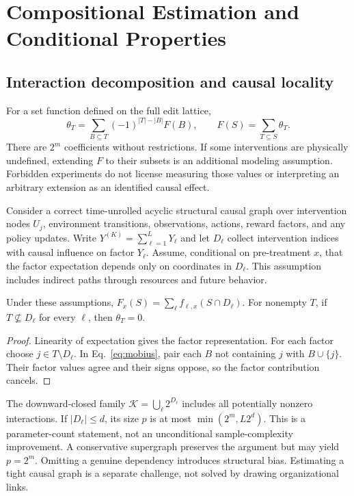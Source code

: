 \documentclass[runningheads]{llncs}
\newcommand{\family}{\mathcal K}
\begin{document}
\section{Compositional Estimation and Conditional Properties}\label{sec:theory}
\subsection{Interaction decomposition and causal locality}
For a set function defined on the full edit lattice,
\begin{equation}\label{eq:mobius}
    \theta_T=\sum_{B\subseteq T}(-1)^{|T|-|B|}F(B),\qquad
    F(S)=\sum_{T\subseteq S}\theta_T.
\end{equation}
There are $2^m$ coefficients without restrictions. If some interventions are physically undefined, extending $F$ to their subsets is an additional modeling assumption. Forbidden experiments do not license measuring those values or interpreting an arbitrary extension as an identified causal effect.

Consider a correct time-unrolled acyclic structural causal graph over intervention nodes $U_j$, environment transitions, observations, actions, reward factors, and any policy updates. Write $Y^{(K)}=\sum_{\ell=1}^L Y_\ell$ and let $D_\ell$ collect intervention indices with causal influence on factor $Y_\ell$. Assume, conditional on pre-treatment $x$, that the factor expectation depends only on coordinates in $D_\ell$. This assumption includes indirect paths through resources and future behavior.

\begin{proposition}\label{prop:locality}
    Under these assumptions, $F_x(S)=\sum_\ell f_{\ell,x}(S\cap D_\ell)$. For nonempty $T$, if $T\nsubseteq D_\ell$ for every $\ell$, then $\theta_T=0$.
\end{proposition}
\begin{proof}
    Linearity of expectation gives the factor representation. For each factor choose $j\in T\setminus D_\ell$. In Eq.~\eqref{eq:mobius}, pair each $B$ not containing $j$ with $B\cup\{j\}$. Their factor values agree and their signs oppose, so the factor contribution cancels.
\end{proof}
The downward-closed family $\family=\bigcup_\ell 2^{D_\ell}$ includes all potentially nonzero interactions. If $|D_\ell|\le d$, its size $p$ is at most $\min(2^m,L2^d)$. This is a parameter-count statement, not an unconditional sample-complexity improvement. A conservative supergraph preserves the argument but may yield $p=2^m$. Omitting a genuine dependency introduces structural bias. Estimating a tight causal graph is a separate challenge, not solved by drawing organizational links.
\end{document}
